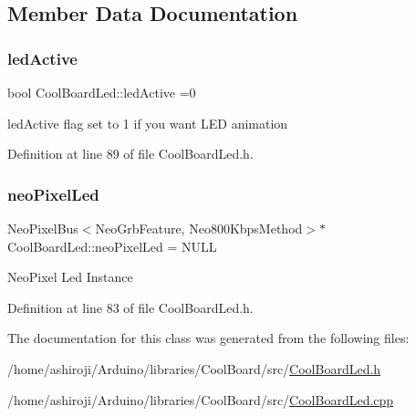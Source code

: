 \subsection{Member Data Documentation}
\mbox{\label{class_cool_board_led_aadd04d2ecf123247718d77f42fba7f08}} 
\subsubsection{\texorpdfstring{led\+Active}{ledActive}}
{\footnotesize\ttfamily bool Cool\+Board\+Led\+::led\+Active =0\hspace{0.3cm}{\ttfamily [private]}}

led\+Active flag set to 1 if you want L\+ED animation 

Definition at line 89 of file Cool\+Board\+Led.\+h.

\mbox{\label{class_cool_board_led_ac2c13fa462a010cd9242bf297c013923}} 
\subsubsection{\texorpdfstring{neo\+Pixel\+Led}{neoPixelLed}}
{\footnotesize\ttfamily Neo\+Pixel\+Bus$<$Neo\+Grb\+Feature, Neo800\+Kbps\+Method$>$$\ast$ Cool\+Board\+Led\+::neo\+Pixel\+Led = N\+U\+LL\hspace{0.3cm}{\ttfamily [private]}}

Neo\+Pixel Led Instance 

Definition at line 83 of file Cool\+Board\+Led.\+h.



The documentation for this class was generated from the following files\+:\begin{DoxyCompactItemize}
\item 
/home/ashiroji/\+Arduino/libraries/\+Cool\+Board/src/\hyperlink{_cool_board_led_8h}{Cool\+Board\+Led.\+h}\item 
/home/ashiroji/\+Arduino/libraries/\+Cool\+Board/src/\hyperlink{_cool_board_led_8cpp}{Cool\+Board\+Led.\+cpp}\end{DoxyCompactItemize}
